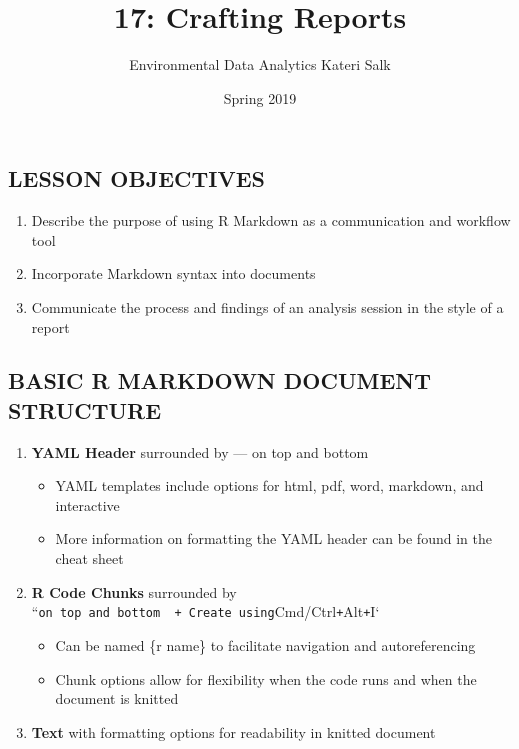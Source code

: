 \documentclass[]{article}
\title{17: Crafting Reports}
\author{Environmental Data Analytics \textbar{} Kateri Salk}
\date{Spring 2019}
\providecommand{\tightlist}{%
  \setlength{\itemsep}{0pt}\setlength{\parskip}{0pt}}
\begin{document}
\maketitle

\hypertarget{lesson-objectives}{%
\subsection{LESSON OBJECTIVES}\label{lesson-objectives}}

\begin{enumerate}
\def\labelenumi{\arabic{enumi}.}
\tightlist
\item
  Describe the purpose of using R Markdown as a communication and
  workflow tool
\item
  Incorporate Markdown syntax into documents
\item
  Communicate the process and findings of an analysis session in the
  style of a report
\end{enumerate}

\hypertarget{basic-r-markdown-document-structure}{%
\subsection{BASIC R MARKDOWN DOCUMENT
STRUCTURE}\label{basic-r-markdown-document-structure}}

\begin{enumerate}
\def\labelenumi{\arabic{enumi}.}
\tightlist
\item
  \textbf{YAML Header} surrounded by --- on top and bottom

  \begin{itemize}
  \tightlist
  \item
    YAML templates include options for html, pdf, word, markdown, and
    interactive
  \item
    More information on formatting the YAML header can be found in the
    cheat sheet
  \end{itemize}
\item
  \textbf{R Code Chunks} surrounded by
  ``\texttt{on\ top\ and\ bottom\ \ +\ Create\ using}Cmd/Ctrl\texttt{+}Alt\texttt{+}I`

  \begin{itemize}
  \tightlist
  \item
    Can be named \{r name\} to facilitate navigation and autoreferencing
  \item
    Chunk options allow for flexibility when the code runs and when the
    document is knitted
  \end{itemize}
\item
  \textbf{Text} with formatting options for readability in knitted
  document
\end{enumerate}
\end{document}
